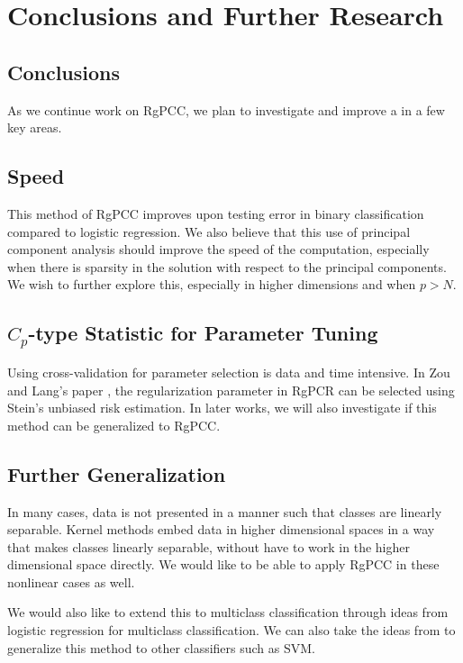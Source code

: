 \documentclass[main.tex]{subfiles}
\begin{document}
\section{Conclusions and Further Research}

\subsection{Conclusions}
As we continue work on RgPCC, we plan to investigate and improve a in a few key areas.

\subsection{Speed}
This method of RgPCC improves upon testing error in binary classification compared to logistic regression. We also believe that this use of principal component analysis should improve the speed of the computation, especially when there is sparsity in the solution with respect to the principal components. We wish to further explore this, especially in higher dimensions and when $p > N$.

\subsection{$C_p$-type Statistic for Parameter Tuning}
Using cross-validation for parameter selection is data and time intensive. In Zou and Lang's paper \cite{langzou}, the regularization parameter in RgPCR can be selected using Stein's unbiased risk estimation. In later works, we will also investigate if this method can be generalized to RgPCC.

\subsection{Further Generalization}
In many cases, data is not presented in a manner such that classes are linearly separable. Kernel methods embed data in higher dimensional spaces in a way that makes classes linearly separable, without have to work in the higher dimensional space directly. We would like to be able to apply RgPCC in these nonlinear cases as well.

We would also like to extend this to multiclass classification through ideas from logistic regression for multiclass classification. We can also take the ideas from \cite{wangleng} to generalize this method to other classifiers such as SVM.
\end{document}
